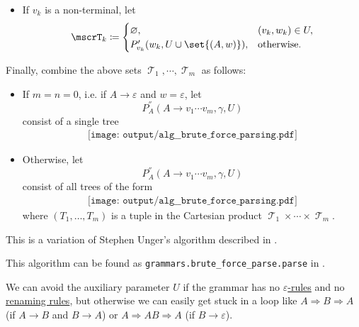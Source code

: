 \begin{algorithm}
\begin{thmenum}
\begin{itemize}
      \item If \( v_k \) is a non-terminal, let
      \begin{equation*}
        \mscrT_k \coloneqq \begin{cases}
          \varnothing,                          &(v_k, w_k) \in U, \\
          P'_{v_k}(w_k, U \cup \set{ (A, w) }), &\T{otherwise.}
        \end{cases}
      \end{equation*}
    \end{itemize}

     Finally, combine the above sets \( \mscrT_1, \cdots, \mscrT_m \) as follows:
    \begin{itemize}
      \item If \( m = n = 0 \), i.e. if \( A \to \varepsilon \) and \( w = \varepsilon \), let
      \begin{equation*}
        P^\dprime_A(A \to v_1 \cdots v_m, \gamma, U)
      \end{equation*}
      consist of a single tree
      \begin{equation*}
        \begin{aligned}
          \texttt{[image: output/alg\_\_brute\_force\_parsing.pdf]}
        \end{aligned}
      \end{equation*}

      \item Otherwise, let
      \begin{equation*}
        P^\dprime_A(A \to v_1 \cdots v_m, \gamma, U)
      \end{equation*}
      consist of all trees of the form
      \begin{equation*}
        \begin{aligned}
          \texttt{[image: output/alg\_\_brute\_force\_parsing.pdf]}
        \end{aligned}
      \end{equation*}
      where \( (T_1, \ldots, T_m) \) is a tuple in the Cartesian product \( \mscrT_1 \times \cdots \times \mscrT_m \).
    \end{itemize}
  \end{thmenum}
\end{algorithm}
\begin{comments}
  \item This is a variation of Stephen Unger's algorithm described in \cite{Unger1968}.
  \item This algorithm can be found as \texttt{grammars.brute\_force\_parse.parse} in \cite{code}.
  \item We can avoid the auxiliary parameter \( U \) if the grammar has no \hyperref[def:epsilon_free_grammar]{\( \varepsilon \)-rules} and no \hyperref[alg:renaming_rule_collapse]{renaming rules}, but otherwise we can easily get stuck in a loop like \( A \Rightarrow B \Rightarrow A \) (if \( A \to B \) and \( B \to A \)) or \( A \Rightarrow AB \Rightarrow A \) (if \( B \to \varepsilon \)).
\end{comments}

